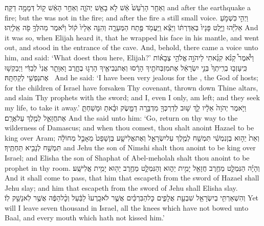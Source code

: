 {וְאַחַ֤ר הָרַ֙עַשׁ֙ אֵ֔שׁ לֹ֥א בָאֵ֖שׁ יְהֹוָ֑ה וְאַחַ֣ר הָאֵ֔שׁ ק֖וֹל דְּמָמָ֥ה דַקָּֽה׃}
{and after the earthquake a fire; but the \lord\space was not in the fire; and after the fire a still small voice.}
{וַיְהִ֣י \legarmeh  כִּשְׁמֹ֣עַ אֵלִיָּ֗הוּ וַיָּ֤לֶט פָּנָיו֙ בְּאַדַּרְתּ֔וֹ וַיֵּצֵ֕א וַֽיַּעֲמֹ֖ד פֶּ֣תַח הַמְּעָרָ֑ה וְהִנֵּ֤ה אֵלָיו֙ ק֔וֹל וַיֹּ֕אמֶר מַה\maqqaf לְּךָ֥ פֹ֖ה אֵֽלִיָּֽהוּ׃}
{And it was so, when Elijah heard it, that he wrapped his face in his mantle, and went out, and stood in the entrance of the cave. And, behold, there came a voice unto him, and said: ‘What doest thou here, Elijah?’}
{וַיֹּ֩אמֶר֩ קַנֹּ֨א קִנֵּ֜אתִי לַיהֹוָ֣ה \legarmeh  אֱלֹהֵ֣י צְבָא֗וֹת כִּֽי\maqqaf עָזְב֤וּ בְרִֽיתְךָ֙ בְּנֵ֣י יִשְׂרָאֵ֔ל אֶת\maqqaf מִזְבְּחֹתֶ֣יךָ הָרָ֔סוּ וְאֶת\maqqaf נְבִיאֶ֖יךָ הָרְג֣וּ בֶחָ֑רֶב וָאִוָּתֵ֤ר אֲנִי֙ לְבַדִּ֔י וַיְבַקְשׁ֥וּ אֶת\maqqaf נַפְשִׁ֖י לְקַחְתָּֽהּ׃ \setuma }
{And he said: ‘I have been very jealous for the \lord, the God of hosts; for the children of Israel have forsaken Thy covenant, thrown down Thine altars, and slain Thy prophets with the sword; and I, even I only, am left; and they seek my life, to take it away.’}
{וַיֹּ֤אמֶר יְהֹוָה֙ אֵלָ֔יו לֵ֛ךְ שׁ֥וּב לְדַרְכְּךָ֖ מִדְבַּ֣רָה דַמָּ֑שֶׂק וּבָ֗אתָ וּמָשַׁחְתָּ֧ אֶת\maqqaf חֲזָאֵ֛ל לְמֶ֖לֶךְ עַל\maqqaf אֲרָֽם׃}
{And the \lord\space said unto him: ‘Go, return on thy way to the wilderness of Damascus; and when thou comest, thou shalt anoint Hazael to be king over Aram;}
{וְאֵת֙ יֵה֣וּא בֶן\maqqaf נִמְשִׁ֔י תִּמְשַׁ֥ח לְמֶ֖לֶךְ עַל\maqqaf יִשְׂרָאֵ֑ל וְאֶת\maqqaf אֱלִישָׁ֤ע בֶּן\maqqaf שָׁפָט֙ מֵאָבֵ֣ל מְחוֹלָ֔ה תִּמְשַׁ֥ח לְנָבִ֖יא תַּחְתֶּֽיךָ׃}
{and Jehu the son of Nimshi shalt thou anoint to be king over Israel; and Elisha the son of Shaphat of Abel-meholah shalt thou anoint to be prophet in thy room.}
{וְהָיָ֗ה הַנִּמְלָ֛ט מֵחֶ֥רֶב חֲזָאֵ֖ל יָמִ֣ית יֵה֑וּא וְהַנִּמְלָ֛ט מֵחֶ֥רֶב יֵה֖וּא יָמִ֥ית אֱלִישָֽׁע׃}
{And it shall come to pass, that him that escapeth from the sword of Hazael shall Jehu slay; and him that escapeth from the sword of Jehu shall Elisha slay.}
{וְהִשְׁאַרְתִּ֥י בְיִשְׂרָאֵ֖ל שִׁבְעַ֣ת אֲלָפִ֑ים כׇּל\maqqaf הַבִּרְכַּ֗יִם אֲשֶׁ֤ר לֹא\maqqaf כָֽרְעוּ֙ לַבַּ֔עַל וְכׇ֨ל\maqqaf הַפֶּ֔ה אֲשֶׁ֥ר לֹֽא\maqqaf נָשַׁ֖ק לֽוֹ׃}
{Yet will I leave seven thousand in Israel, all the knees which have not bowed unto Baal, and every mouth which hath not kissed him.’}
